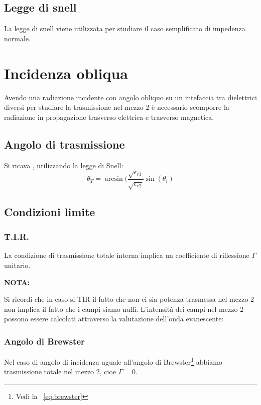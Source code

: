 \documentclass[10pt,a4paper]{report}
\begin{document}
	\section{Legge di snell}

	La legge di snell viene utilizzata per studiare il caso semplificato di impedenza normale.


\chapter{Incidenza obliqua}

	Avendo una radiazione incidente con angolo obliquo su un intefaccia tra dielettrici diversi per studiare la trasmissione nel mezzo 2 è necessario scomporre la radiazione in propagazione trasverso elettrica e trasverso magnetica.

	\section{Angolo di trasmissione}
	Si ricava , utilizzando la legge di Snell:
	\begin{equation}
	\theta_T=\arcsin(\frac{\sqrt{\epsilon_{r1}}}{\sqrt{\epsilon_{r2}}}\sin(\theta_i)
	\end{equation} 
	
	\section{Condizioni limite}

		\subsection{T.I.R.}
			La condizione di trasmissione totale interna implica un coefficiente di riflessione $\Gamma$ unitario.

			\textbf{NOTA:}

			Si ricordi che in caso si TIR il fatto che non ci sia potenza trasmessa nel mezzo 2 non implica il fatto che i campi siamo nulli.
			L'intensità dei campi nel mezzo 2 possono essere calcolati attraverso la valutazione dell'onda evanescente:


		
		\subsection{Angolo di Brewster}

			Nel caso di angolo di incidenza uguale all'angolo di Brewster\footnote{Vedi la ~\ref{eq:brewster}} abbiamo trasmissione totale nel mezzo 2, cioe $\Gamma=0$.
\end{document}
